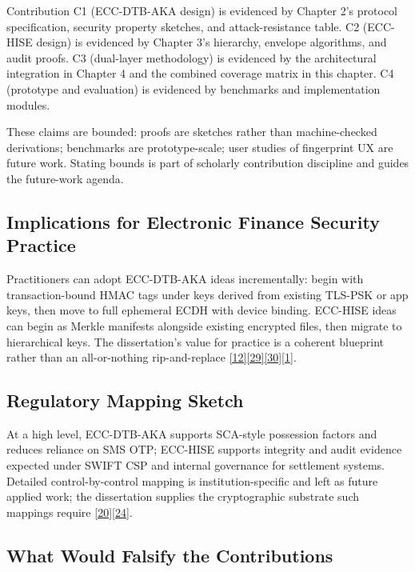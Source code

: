 \indent Contribution C1 (ECC-DTB-AKA design) is evidenced by Chapter 2's protocol specification, security property sketches, and attack-resistance table. C2 (ECC-HISE design) is evidenced by Chapter 3's hierarchy, envelope algorithms, and audit proofs. C3 (dual-layer methodology) is evidenced by the architectural integration in Chapter 4 and the combined coverage matrix in this chapter. C4 (prototype and evaluation) is evidenced by benchmarks and implementation modules.

\indent These claims are bounded: proofs are sketches rather than machine-checked derivations; benchmarks are prototype-scale; user studies of fingerprint UX are future work. Stating bounds is part of scholarly contribution discipline and guides the future-work agenda.

\subsection{Implications for Electronic Finance Security Practice}

\indent Practitioners can adopt ECC-DTB-AKA ideas incrementally: begin with transaction-bound HMAC tags under keys derived from existing TLS-PSK or app keys, then move to full ephemeral ECDH with device binding. ECC-HISE ideas can begin as Merkle manifests alongside existing encrypted files, then migrate to hierarchical keys. The dissertation's value for practice is a coherent blueprint rather than an all-or-nothing rip-and-replace \hyperref[ref:12]{[12]}\hyperref[ref:29]{[29]}\hyperref[ref:30]{[30]}\hyperref[ref:1]{[1]}.

\subsection{Regulatory Mapping Sketch}

\indent At a high level, ECC-DTB-AKA supports SCA-style possession factors and reduces reliance on SMS OTP; ECC-HISE supports integrity and audit evidence expected under SWIFT CSP and internal governance for settlement systems. Detailed control-by-control mapping is institution-specific and left as future applied work; the dissertation supplies the cryptographic substrate such mappings require \hyperref[ref:20]{[20]}\hyperref[ref:24]{[24]}.

\subsection{What Would Falsify the Contributions}


